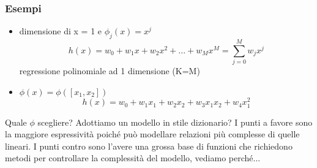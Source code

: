 \documentclass{article}
\begin{document}
\subsubsection{Esempi}
\begin{itemize}
    \item dimensione di x = 1 e $\phi_j(x)=x^j$ 
    \begin{equation}
    h(x) = w_0+w_1x+w_2x^2+...+w_Mx^M=\sum_{j = 0}^M w_jx^j
    \end{equation}
    regressione polinomiale ad 1 dimensione (K=M)
    \item $\phi(x)=\phi([x_1,x_2])$
    \begin{equation}
    h(x) = w_0+w_1x_1+w_2x_2+w_3x_1x_2+w_4x_1^2
    \end{equation}
\end{itemize}
Quale $\phi$ scegliere? Adottiamo un modello in stile dizionario? I punti a favore sono la maggiore espressività poiché può modellare relazioni più complesse di quelle lineari. I punti contro sono l'avere una grossa base di funzioni che richiedono metodi per controllare la complessità del modello, vediamo perché...
\end{document}
